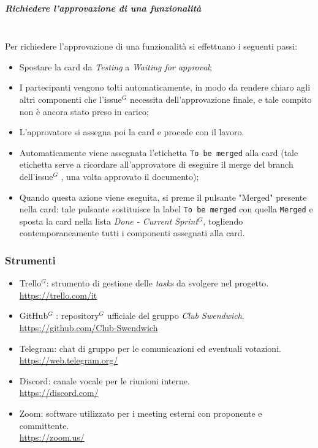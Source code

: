 \subparagraph{Richiedere l'approvazione di una funzionalità}
\mbox{}\\
Per richiedere l'approvazione di una funzionalità si effettuano i seguenti passi:
\begin{itemize}
    \item Spostare la card da \textit{Testing} a \textit{Waiting for approval};
    \item I partecipanti vengono tolti automaticamente, in modo da rendere chiaro agli altri componenti che l'issue$^G$  necessita dell'approvazione finale, e tale compito non è ancora stato preso in carico;
    \item L'approvatore si assegna poi la card e procede con il lavoro.
    \item Automaticamente viene assegnata l'etichetta \texttt{To be merged} alla card (tale etichetta serve a ricordare all'approvatore di eseguire il merge del branch dell'issue$^G$ , una volta approvato il documento);
    \item Quando questa azione viene eseguita, si preme il pulsante "Merged" presente nella card: tale pulsante sostituisce la label \texttt{To be merged} con quella \texttt{Merged} e sposta la card nella lista \textit{Done - Current Sprint}$^G$, togliendo contemporaneamente tutti i componenti assegnati alla card.
\end{itemize}

\subsubsection{Strumenti}

\begin{itemize}
    \item Trello$^G$: strumento di gestione delle \textit{tasks} da svolgere nel progetto. \\
    \href{https://trello.com/it}{https://trello.com/it}
    \item GitHub$^G$ : repository$^G$  ufficiale del gruppo \textit{Club Swendwich}.\\
    \href{https://github.com/Club-Swendwich}{https://github.com/Club-Swendwich}
    \item Telegram: chat di gruppo per le comunicazioni ed eventuali votazioni. \\
    \href{https://web.telegram.org/}{https://web.telegram.org/}
    \item Discord: canale vocale per le riunioni interne.\\
    \href{https://discord.com/}{https://discord.com/}
    \item Zoom: software utilizzato per i meeting esterni con proponente e committente.\\
    \href{https://zoom.us/}{https://zoom.us/}
\end{itemize}
